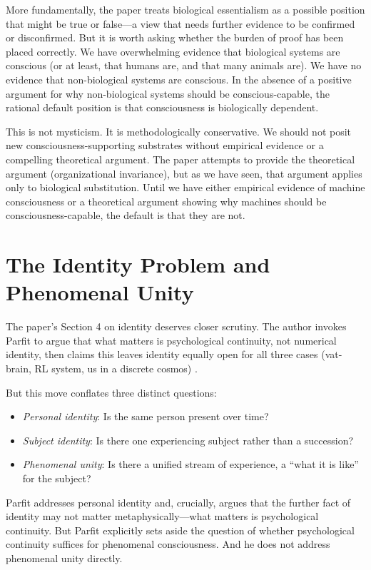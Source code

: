 \documentclass[11pt]{article}
\begin{document}
More fundamentally, the paper treats biological essentialism as a possible position that might be true or false---a view that needs further evidence to be confirmed or disconfirmed. But it is worth asking whether the burden of proof has been placed correctly. We have overwhelming evidence that biological systems are conscious (or at least, that humans are, and that many animals are). We have no evidence that non-biological systems are conscious. In the absence of a positive argument for why non-biological systems should be conscious-capable, the rational default position is that consciousness is biologically dependent.

This is not mysticism. It is methodologically conservative. We should not posit new consciousness-supporting substrates without empirical evidence or a compelling theoretical argument. The paper attempts to provide the theoretical argument (organizational invariance), but as we have seen, that argument applies only to biological substitution. Until we have either empirical evidence of machine consciousness or a theoretical argument showing why machines should be consciousness-capable, the default is that they are not.

\section{The Identity Problem and Phenomenal Unity}

The paper's Section 4 on identity deserves closer scrutiny. The author invokes Parfit to argue that what matters is psychological continuity, not numerical identity, then claims this leaves identity equally open for all three cases (vat-brain, RL system, us in a discrete cosmos) \citep{parfit1984}.

But this move conflates three distinct questions:

\begin{itemize}
\item \textit{Personal identity}: Is the same person present over time?
\item \textit{Subject identity}: Is there one experiencing subject rather than a succession?
\item \textit{Phenomenal unity}: Is there a unified stream of experience, a ``what it is like'' for the subject?
\end{itemize}

Parfit addresses personal identity and, crucially, argues that the further fact of identity may not matter metaphysically---what matters is psychological continuity. But Parfit explicitly sets aside the question of whether psychological continuity suffices for phenomenal consciousness. And he does not address phenomenal unity directly.
\end{document}
